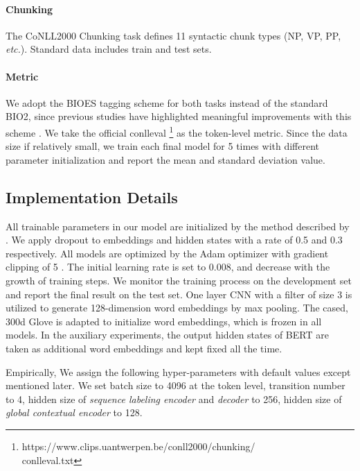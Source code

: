\documentclass[11pt,a4paper]{article}
\begin{document}
\paragraph{Chunking}
The CoNLL2000 Chunking task \cite{CoNLL2000} defines 11 syntactic chunk types (NP, VP, PP, {\em etc.}). Standard data includes train and test sets.

\paragraph{Metric}
We adopt the BIOES tagging scheme for both tasks instead of the standard BIO2, since previous studies have highlighted meaningful improvements with this scheme \cite{BIES}. We take the official conlleval \footnote{https://www.clips.uantwerpen.be/conll2000/chunking/\\conlleval.txt} as the token-level   metric. Since the data size if relatively small, we train each final model for 5 times with different parameter initialization and report the mean and standard deviation  value. 

\subsection{Implementation Details}
All trainable parameters in our model are initialized by the method described by \citeauthor{Xavier} . We apply dropout \cite{dropout} to embeddings and hidden states with a rate of 0.5 and 0.3 respectively. All models are optimized by the Adam optimizer \cite{Adam} with gradient clipping of 5 \cite{gradient_clip}. 
The initial learning rate  is set to 0.008, and decrease with the growth of training steps. We monitor the training process on the development set and report the final result on the test set. 
One layer CNN with a filter of size 3 is utilized to generate 128-dimension word embeddings by max pooling. The cased, 300d Glove is adapted to initialize word embeddings, which is frozen in all models. In the auxiliary experiments, the output hidden states of BERT are taken as additional word embeddings and kept fixed all the time.

Empirically, We assign the following hyper-parameters with default values except 
mentioned later.
We set batch size to 4096 at the token level, transition number to 4, hidden size of \emph{sequence labeling encoder} and \emph{decoder} to 256, hidden size of \emph{global contextual encoder} to 128. 
\end{document}
